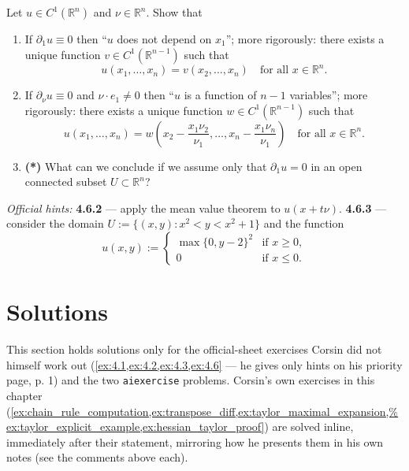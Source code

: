 \begin{exercise}
\label{ex:4.6}
Let $u \in C^1(\mathbb{R}^n)$ and $\nu \in \mathbb{R}^n$. Show that
\begin{enumerate}[label=\textbf{\arabic*.}]
  \item If $\partial_1 u \equiv 0$ then ``$u$ does not depend on $x_1$''; more rigorously: there
    exists a unique function $v \in C^1(\mathbb{R}^{n-1})$ such that
    \begin{equation*}
    u(x_1,\dots,x_n) = v(x_2,\dots,x_n) \quad \text{for all } x \in \mathbb{R}^n. \tag{2}
    \end{equation*}
  \item If $\partial_\nu u \equiv 0$ and $\nu\cdot e_1 \neq 0$ then ``$u$ is a function of $n-1$
    variables''; more rigorously: there exists a unique function $w \in C^1(\mathbb{R}^{n-1})$
    such that
    \[u(x_1,\dots,x_n) = w\!\left(x_2 - \frac{x_1\nu_2}{\nu_1}, \dots, x_n - \frac{x_1\nu_n}{\nu_1}\right) \quad \text{for all } x \in \mathbb{R}^n.\]
  \item \textbf{(*)} What can we conclude if we assume only that $\partial_1 u = 0$ in an open
    connected subset $U \subset \mathbb{R}^n$?
\end{enumerate}
\textit{Official hints:} \textbf{4.6.2} --- apply the mean value theorem to $u(x + t\nu)$.
\textbf{4.6.3} --- consider the domain $U := \{(x,y) : x^2 < y < x^2+1\}$ and the function
\[u(x,y) := \begin{cases} \max\{0, y-2\}^2 & \text{if } x \geq 0, \\ 0 & \text{if } x \leq 0.\end{cases}\]
\end{exercise}

\section{Solutions}
\label{sec:week04_solutions}

\begin{ainote}
This section holds solutions only for the official-sheet exercises Corsin did not himself work
out (\cref{ex:4.1,ex:4.2,ex:4.3,ex:4.6} --- he gives only hints on his priority page, p. 1) and
the two \texttt{aiexercise} problems. Corsin's own exercises in this chapter
(\cref{ex:chain_rule_computation,ex:transpose_diff,ex:taylor_maximal_expansion,%
ex:taylor_explicit_example,ex:hessian_taylor_proof}) are solved inline, immediately after their
statement, mirroring how he presents them in his own notes (see the  comments above
each).
\end{ainote}

